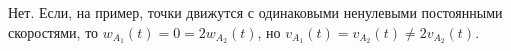Нет. Если, на
пример, точки движутся с одинаковыми ненулевыми постоянными скоростями,
то $w_{A_{1}}(t)=0=2w_{A_{2}}(t)$, но $v_{A_{1}}(t)=v_{A_{2}}(t)\ne 
2v_{A_{2}}(t)$.
